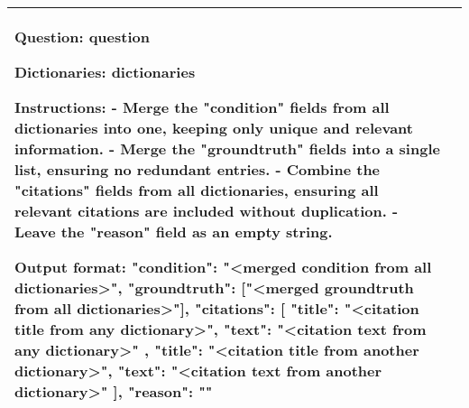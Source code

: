 \begin{tabular}{l p{}}
Question:
{question}

Dictionaries:
{dictionaries}

Instructions:
- Merge the "condition" fields from all dictionaries into one, keeping only unique and relevant information.
- Merge the "groundtruth" fields into a single list, ensuring no redundant entries.
- Combine the "citations" fields from all dictionaries, ensuring all relevant citations are included without duplication.
- Leave the "reason" field as an empty string.

Output format:
{
  "condition": "<merged condition from all dictionaries>",
  "groundtruth": ["<merged groundtruth from all dictionaries>"],
  "citations": [
    {
      "title": "<citation title from any dictionary>",
      "text": "<citation text from any dictionary>"
    },
    {
      "title": "<citation title from another dictionary>",
      "text": "<citation text from another dictionary>"
    }
  ],
  "reason": ""
} \\
\hline
\end{tabular}


